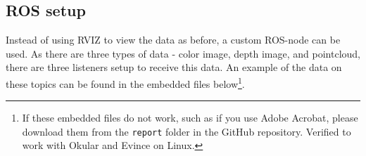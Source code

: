 \documentclass[11pt]{article}
\begin{document}
\subsection{ROS setup}
Instead of using RVIZ to view the data as before, a custom ROS-node can be used. As there are three types of data - color image, depth image, and pointcloud, there are three listeners setup to receive this data. An example of the data on these topics can be found in the embedded files below\footnote{If these embedded files do not work, such as if you use Adobe Acrobat, please download them from the \texttt{report} folder in the GitHub repository. Verified to work with Okular and Evince on Linux.}. \par

\begin{center}
\end{center}

\end{document}
